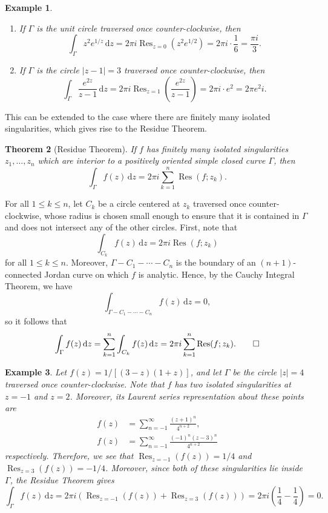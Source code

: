 \documentclass[10pt]{article}
\makeatletter
\newcommand{\dd}{\,\mathrm{d}}
\DeclareMathOperator{\Res}{Res}
\theoremstyle{newstyle}
\newtheorem{thm}{Theorem}[section]
\newtheorem{exmp}[thm]{Example}
\newenvironment{pf}[1][\proofname]{\par
  \pushQED{\qed}%
  \normalfont \topsep0\p@\relax
  \trivlist
  \item[\hskip\labelsep\scshape
  #1\@addpunct{.}]\ignorespaces
}{%
  \popQED\endtrivlist\@endpefalse
}
\makeatother
\begin{document}
\begin{exmp}~
\begin{enumerate}[(1)]
    \item If $\Gamma$ is the unit circle traversed once counter-clockwise, then 
    \[ \int_\Gamma z^2e^{1/z}\dd z = 2\pi i \Res_{z=0}(z^2e^{1/2}) = 2\pi i \cdot \frac16 = \frac{\pi i}3. \]
    \item If $\Gamma$ is the circle $|z-1| = 3$ traversed once counter-clockwise, then 
    \[ \int_\Gamma \frac{e^{2z}}{z-1}\dd z = 2\pi i \Res_{z=1} \left( \frac{e^{2z}}{z-1} \right) 
    = 2\pi i \cdot e^2 = 2\pi e^2i. \]
\end{enumerate}
\end{exmp}

This can be extended to the case where there are finitely many isolated singularities, which gives rise
to the Residue Theorem. 

\begin{thm}[Residue Theorem]
If $f$ has finitely many isolated singularities $z_1, \dots, z_n$ which are interior to 
a positively oriented simple closed curve $\Gamma$, then 
\[ \int_\Gamma f(z)\dd z = 2\pi i \sum_{k=1}^n \Res(f; z_k). \]
\end{thm}
\begin{pf}
For all $1 \leq k \leq n$, let $C_k$ be a circle centered at $z_k$ traversed once counter-clockwise, 
whose radius is chosen small enough to ensure that it is contained in $\Gamma$ and does not 
intersect any of the other circles. First, note that 
\[ \int_{C_k} f(z)\dd z = 2\pi i \Res(f; z_k) \]
for all $1 \leq k \leq n$. Moreover, $\Gamma - C_1 - \cdots - C_n$ is the boundary of an 
$(n+1)$-connected Jordan curve on which $f$ is analytic. Hence, by the Cauchy Integral Theorem, 
we have 
\[ \int_{\Gamma-C_1-\cdots-C_n} f(z)\dd z = 0, \]
so it follows that 
\[ \int_\Gamma f(z)\dd z = \sum_{k=1}^n \int_{C_k} f(z)\dd z = 2\pi i \sum_{k=1}^n \Res(f; z_k). 
\qedhere \]
\end{pf}

\begin{exmp}
Let $f(z) = 1/[(3-z)(1+z)]$, and let $\Gamma$ be the circle $|z| = 4$ traversed once counter-clockwise. 
Note that $f$ has two isolated singularities at $z = -1$ and $z = 2$. Moreover, its Laurent 
series representation about these points are 
\begin{align*}
    f(z) &= \sum_{n=-1}^\infty \frac{(z+1)^n}{4^{n+2}}, \\
    f(z) &= \sum_{n=-1}^\infty \frac{(-1)^n (z-3)^n}{4^{n+2}} 
\end{align*}
respectively. Therefore, we see that $\Res_{z=-1}(f(z)) = 1/4$ and $\Res_{z=3}(f(z)) = -1/4$.
Moreover, since both of these singularities lie inside $\Gamma$, the Residue Theorem gives 
\[ \int_\Gamma f(z)\dd z = 2\pi i (\Res_{z=-1}(f(z)) + \Res_{z=3}(f(z))) = 2\pi i \left( \frac14 - 
\frac14 \right) = 0. \]
\end{exmp}
\end{document}
